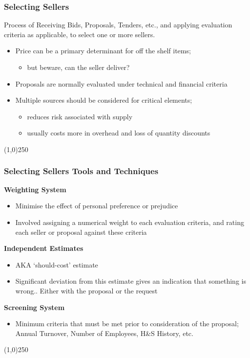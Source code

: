 \begin{frame}
\frametitle{Selecting Sellers}
Process of Receiving Bids, Proposals, Tenders, etc., and applying evaluation criteria as applicable, to select one or more sellers.\\
\begin{itemize}
	\item Price can be a primary determinant for off the shelf items; 
		\begin{itemize}
			\item but beware, can the seller deliver?
		\end{itemize}
	\item Proposals are normally evaluated under technical and financial criteria
	\item Multiple sources should be considered for critical elements; 
		\begin{itemize}
			\item reduces risk associated with supply
			\item usually costs more in overhead and loss of quantity discounts
		\end{itemize}
\end{itemize}
\end{frame}\begin{center}\line(1,0){250}\end{center}



\begin{frame}
\frametitle{Selecting Sellers \hfill\hfill Tools and Techniques}
\textbf{Weighting System}
\begin{itemize}
	\item Minimise the effect of personal preference or prejudice
	\item Involved assigning a numerical weight to each evaluation criteria, and rating each seller or proposal against these criteria
\end{itemize}
\textbf{Independent Estimates}
\begin{itemize}
	\item AKA `should-cost' estimate
	\item Significant deviation from this estimate gives an indication that something is wrong.. Either with the proposal or the request
\end{itemize}
\textbf{Screening System}
\begin{itemize}
	\item Minimum criteria that must be met prior to consideration of the proposal;  Annual Turnover, Number of Employees, H\&S History, etc.
\end{itemize}
\end{frame}\begin{center}\line(1,0){250}\end{center}


